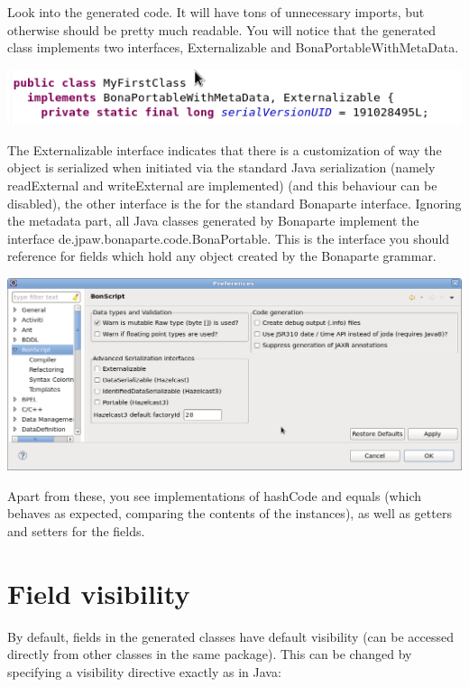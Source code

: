 \documentclass[11pt,a4paper,oneside]{article}
\begin{document}
Look into the generated code. It will have tons of unnecessary imports, but otherwise should be pretty much readable.
You will notice that the generated class implements two interfaces, {\ttfamily Externalizable} and {\ttfamily BonaPortableWithMetaData}.

\vspace{2mm}
\hspace{1cm}\includegraphics[scale=0.5]{images/tut1-004.png}

\noindent 
The {\ttfamily Externalizable} interface indicates that there is a customization of way the object is serialized when initiated
via the standard Java serialization (namely {\ttfamily readExternal} and {\ttfamily writeExternal} are implemented) (and this behaviour can be disabled),
the other interface is the for the standard Bonaparte interface. Ignoring the metadata part, all Java classes generated by Bonaparte implement the interface
 {\ttfamily de.jpaw.bonaparte.code.BonaPortable}. This is the interface you should reference for fields which hold any object created by the Bonaparte grammar.


\vspace{2mm}
\begin{center}
\includegraphics[scale=0.45]{images/tut1-prefs1.png}
\end{center}

Apart from these, you see implementations of {\ttfamily hashCode} and {\ttfamily equals} (which behaves as expected, comparing the contents of
the instances), as well as getters and setters for the fields.

\section{Field visibility}
By default, fields in the generated classes have default visibility (can be accessed directly from other classes in the same package). This can be changed by
specifying a visibility directive exactly as in Java:
\end{document}
